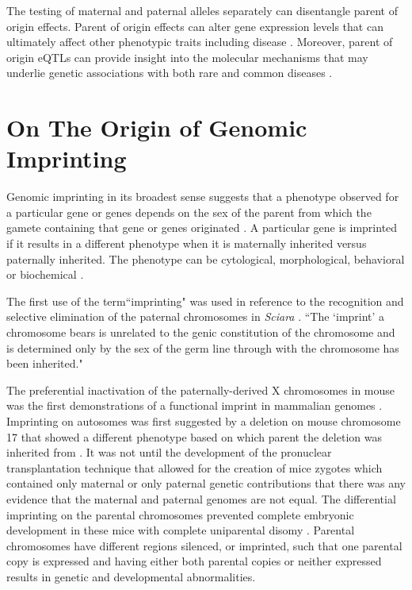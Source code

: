 The testing of maternal and paternal alleles separately can disentangle parent of origin effects. Parent of origin effects can alter gene expression levels that can ultimately affect other phenotypic traits including disease \cite{Lawson2013,Peters2014} . Moreover, parent of origin eQTLs can provide insight into the molecular mechanisms that may underlie genetic associations with both rare and common diseases \cite{Lawson2013,Peters2014,Kong:2009kk,Stridh2014,Falls1999}.



\section{On The Origin of Genomic Imprinting }

Genomic imprinting in its broadest sense suggests that a phenotype observed for a particular gene or genes depends on the sex of the parent from which the gamete containing that gene or genes originated \cite{Sapienza:1989vm}. A particular gene is imprinted if it results in a different phenotype when it is maternally inherited versus paternally inherited. The phenotype can be cytological, morphological, behavioral or biochemical \cite{Sapienza:1989vm}.

The first use of the term``imprinting" was used in reference to the recognition and selective elimination of the paternal chromosomes in \textit{Sciara} \cite{Crouse:1960vc,Sapienza:1989vm}. ``The `imprint' a chromosome bears is unrelated to the genic constitution of the chromosome and is determined only by the sex of the germ line through with the chromosome has been inherited." \cite{Crouse:1960vc} 

The preferential inactivation of the paternally-derived X chromosomes in mouse was the first demonstrations of a functional imprint in mammalian genomes \cite{Takagi:1975ua,Lyon:1984gh,Chandra:1975tb}. Imprinting on autosomes was first suggested by a deletion on mouse chromosome 17 that showed a different phenotype based on which parent the deletion was inherited from \cite{Johnson:1974uf,Johnson:1974kc}. It was not until the development of the pronuclear transplantation technique that allowed for the creation of mice zygotes which contained only maternal or only paternal genetic contributions that there was any evidence that the maternal and paternal genomes are not equal. The differential imprinting on the parental chromosomes prevented complete embryonic development in these mice with complete uniparental disomy \cite{Sapienza:1989vm,McGrath:1984ky}. Parental chromosomes have different regions silenced, or imprinted, such that one parental copy is expressed and having either both parental copies or neither expressed results in genetic and developmental abnormalities.


